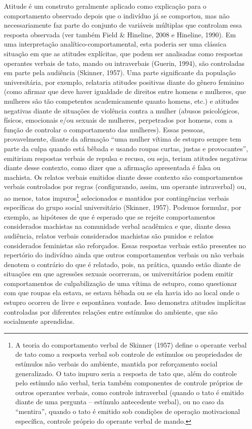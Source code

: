 Atitude é um construto geralmente aplicado como explicação para o comportamento observado depois que o indivíduo já se comportou, mas não necessariamente faz parte do conjunto de variáveis múltiplas que controlam essa resposta observada (ver também Field \& Hineline, 2008 e Hineline, 1990). Em uma interpretação analítico-comportamental, esta poderia ser uma clássica situação em que as atitudes explícitas, que podem ser analisadas como respostas operantes verbais de tato, mando ou intraverbais (Guerin, 1994), são controladas em parte pela audiência (Skinner, 1957). Uma parte significante da população universitária, por exemplo, relataria atitudes positivas diante do gênero feminino (como afirmar que deve haver igualdade de direitos entre homens e mulheres, que mulheres são tão competentes academicamente quanto homens, etc.) e atitudes negativas diante de situações de violência contra a mulher (abusos psicológicos, físicos, emocionais e/ou sexuais de mulheres, perpetrados por homens, com a função de controlar o comportamento das mulheres). Essas pessoas, provavelmente, diante da afirmação ``uma mulher vítima de estupro sempre tem parte da culpa quando está bêbada e usando roupas curtas, justas e provocantes'', emitiriam respostas verbais de repulsa e recusa, ou seja, teriam atitudes negativas diante desse contexto, como dizer que a afirmação apresentada é falsa ou machista. Os relatos verbais emitidos diante desse contexto são comportamentos verbais controlados por regras (configurando, assim, um operante intraverbal) ou, ao menos, tatos impuros\footnote{A teoria do comportamento verbal de Skinner (1957) define o operante verbal de tato como a resposta verbal sob controle de estímulos ou propriedades de estímulos não verbais do ambiente, mantida por reforçamento social generalizado. O tato impuro seria a resposta de tato que, além do controle pelo estímulo não verbal, teria também componentes de controle próprios de outros operantes verbais, como controle intraverbal (quando o tato é emitido diante de uma pergunta – estímulo antecedente verbal), ou no caso da ``mentira'', quando o tato é emitido sob condições de operação motivacional específica, controle próprio do operante verbal de mando.} selecionados e mantidos por contingências verbais específicas do grupo social universitário (Skinner, 1957). Podemos formular, por exemplo, as hipóteses de que é esperado que se rejeite comportamentos considerados machistas na comunidade verbal acadêmica e que, diante dessa audiência, relatos verbais considerados machistas são punidos e relatos considerados feministas são reforçados. Essas respostas verbais estão presentes no repertório do indivíduo ainda que outros comportamentos verbais ou não verbais denotem o contrário do que é relatado, pois, na prática, quando estão diante de situações em que agressões sexuais ocorreram, os universitários podem emitir comportamentos de culpabilização de uma vítima de estupro, como questionar com que roupas ela estava, se estava bêbada ou se ela havia ido ao local onde o estupro ocorreu de livre e espontânea vontade. Isso demonstra atitudes implícitas controladas por diferentes relações entre estímulos do ambiente, que são socialmente aprendidas.

